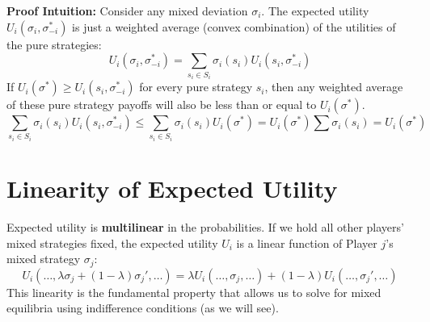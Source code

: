 \documentclass[12pt, a4paper]{article}
\begin{document}
\textbf{Proof Intuition:}
Consider any mixed deviation $\sigma_i$. The expected utility $U_i(\sigma_i, \sigma_{-i}^*)$ is just a weighted average (convex combination) of the utilities of the pure strategies:
\[
  U_i(\sigma_i, \sigma_{-i}^*) = \sum_{s_i \in S_i} \sigma_i(s_i) U_i(s_i, \sigma_{-i}^*)
\]
If $U_i(\sigma^*) \geq U_i(s_i, \sigma_{-i}^*)$ for every pure strategy $s_i$, then any weighted average of these pure strategy payoffs will also be less than or equal to $U_i(\sigma^*)$.
\[
  \sum_{s_i \in S_i} \sigma_i(s_i) U_i(s_i, \sigma_{-i}^*) \leq \sum_{s_i \in S_i} \sigma_i(s_i) U_i(\sigma^*) = U_i(\sigma^*) \sum \sigma_i(s_i) = U_i(\sigma^*)
\]

\section{Linearity of Expected Utility}

Expected utility is \textbf{multilinear} in the probabilities. If we hold all other players' mixed strategies fixed, the expected utility $U_i$ is a linear function of Player $j$'s mixed strategy $\sigma_j$:
\[
  U_i(\dots, \lambda\sigma_j + (1-\lambda)\sigma_j', \dots) = \lambda U_i(\dots, \sigma_j, \dots) + (1-\lambda) U_i(\dots, \sigma_j', \dots)
\]
This linearity is the fundamental property that allows us to solve for mixed equilibria using indifference conditions (as we will see).
\end{document}
